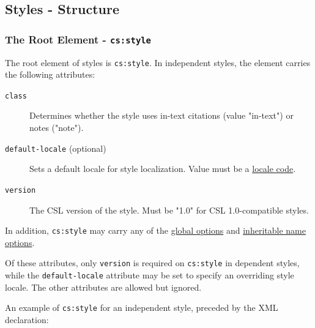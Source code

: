 \hypertarget{styles---structure}{%
\subsection{Styles - Structure}\label{styles---structure}}

\hypertarget{the-root-element---csstyle}{%
\subsubsection{\texorpdfstring{The Root Element -
\texttt{cs:style}}{The Root Element - cs:style}}\label{the-root-element---csstyle}}

The root element of styles is \texttt{cs:style}. In independent styles,
the element carries the following attributes:

\begin{description}
\item[\texttt{class}]
Determines whether the style uses in-text citations (value "in-text") or
notes ("note").
\item[\texttt{default-locale} (optional)]
Sets a default locale for style localization. Value must be a
\href{http://books.xmlschemata.org/relaxng/ch19-77191.html}{locale
code}.
\item[\texttt{version}]
The CSL version of the style. Must be "1.0" for CSL 1.0-compatible
styles.
\end{description}

In addition, \texttt{cs:style} may carry any of the
\protect\hyperlink{global-options}{global options} and
\protect\hyperlink{inheritable-name-options}{inheritable name options}.

Of these attributes, only \texttt{version} is required on
\texttt{cs:style} in dependent styles, while the \texttt{default-locale}
attribute may be set to specify an overriding style locale. The other
attributes are allowed but ignored.

An example of \texttt{cs:style} for an independent style, preceded by
the XML declaration:

\begin{Shaded}
\begin{Highlighting}[]
\NormalTok{\textless{}}\NormalTok{/\textgreater{}}
\end{Highlighting}
\end{Shaded}

